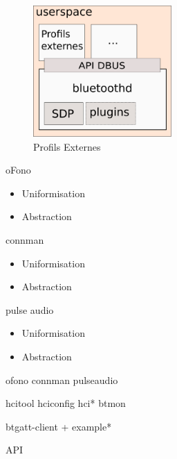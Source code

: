\begin{frame}
\begin{minipage}[t]{0.60\linewidth}
	\begin{figure}
		\includegraphics[height=5cm]{bluetoothd.png}
		\caption{Profils Externes}
	\end{figure}
\end{minipage}
\begin{minipage}[t]{0.30\linewidth}
	\begin{block}{oFono}
		\begin{itemize}
			\item Uniformisation
			\item Abstraction
		\end{itemize}
	\end{block}
	\begin{block}{connman}
		\begin{itemize}
			\item Uniformisation
			\item Abstraction
		\end{itemize}
	\end{block}
	\begin{block}{pulse audio}
		\begin{itemize}
			\item Uniformisation
			\item Abstraction
		\end{itemize}
	\end{block}
\end{minipage}
\end{frame}

\begin{frame}
ofono connman pulseaudio
\end{frame}

\begin{frame}
hcitool hciconfig hci* btmon
\end{frame}

\begin{frame}
btgatt-client + example*
\end{frame}

\begin{frame}
API
\end{frame}


